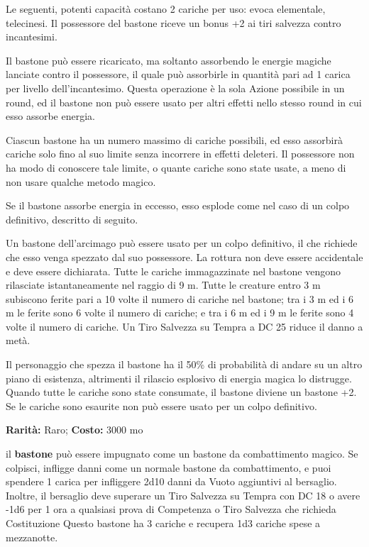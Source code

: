 \begin{multicols}{2}
Le seguenti, potenti capacità costano 2 cariche per uso: evoca elementale, telecinesi. Il possessore del bastone riceve un bonus +2 ai tiri salvezza contro incantesimi.

Il bastone può essere ricaricato, ma soltanto assorbendo le energie magiche lanciate contro il possessore, il quale può assorbirle in quantità pari ad 1 carica per livello dell'incantesimo. Questa operazione è la sola Azione possibile in un round, ed il bastone non può essere usato per altri effetti nello stesso round in cui esso assorbe energia.

Ciascun bastone ha un numero massimo di cariche possibili, ed esso assorbirà cariche solo fino al suo limite senza incorrere in effetti deleteri. Il possessore non ha modo di conoscere tale limite, o quante cariche sono state usate, a meno di non usare qualche metodo magico.

Se il bastone assorbe energia in eccesso, esso esplode come nel caso di un colpo definitivo, descritto di seguito.

Un bastone dell'arcimago può essere usato per un colpo definitivo, il che richiede che esso venga spezzato dal suo possessore. La rottura non deve essere accidentale e deve essere dichiarata. Tutte le cariche immagazzinate nel bastone vengono rilasciate istantaneamente nel raggio di 9 m. Tutte le creature entro 3 m subiscono ferite pari a 10 volte il numero di cariche nel bastone; tra i 3 m ed i 6 m le ferite sono 6 volte il numero di cariche; e tra i 6 m ed i 9 m le ferite sono 4 volte il numero di cariche. Un Tiro Salvezza su Tempra a DC 25 riduce il danno a metà.

Il personaggio che spezza il bastone ha il 50\% di probabilità di andare su un altro piano di esistenza, altrimenti il rilascio esplosivo di energia magica lo distrugge. Quando tutte le cariche sono state consumate, il bastone diviene un bastone +2. Se le cariche sono esaurite non può essere usato per un colpo definitivo.


\textbf{Rarità:} Raro; \textbf{Costo:} 3000 mo

il \textbf{bastone} può essere impugnato come un bastone da combattimento magico. Se colpisci, infligge danni come un normale bastone da combattimento, e puoi spendere 1 carica per infliggere 2d10 danni da Vuoto aggiuntivi al bersaglio. Inoltre, il bersaglio deve superare un Tiro Salvezza su Tempra con DC 18 o avere -1d6 per 1 ora a qualsiasi prova di Competenza o Tiro Salvezza che richieda Costituzione Questo bastone ha 3 cariche e recupera 1d3 cariche spese a mezzanotte.


\end{multicols}
